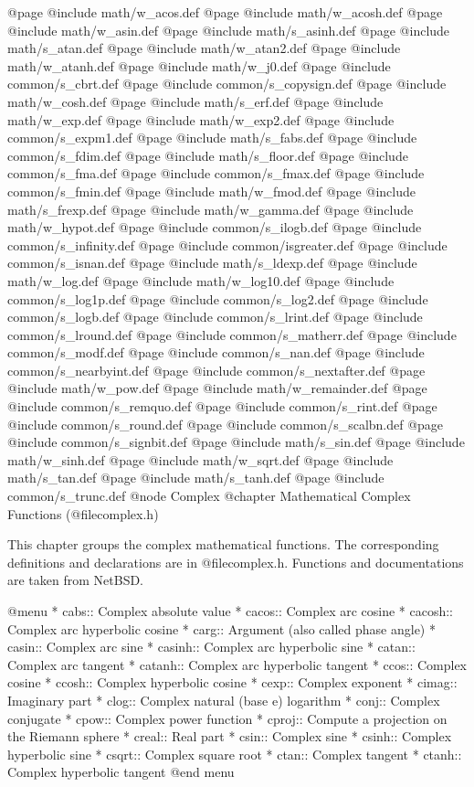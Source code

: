 @page @include   math/w_acos.def
@page @include   math/w_acosh.def
@page @include   math/w_asin.def
@page @include   math/s_asinh.def
@page @include   math/s_atan.def
@page @include   math/w_atan2.def
@page @include   math/w_atanh.def
@page @include   math/w_j0.def
@page @include common/s_cbrt.def
@page @include common/s_copysign.def
@page @include   math/w_cosh.def
@page @include   math/s_erf.def
@page @include   math/w_exp.def
@page @include   math/w_exp2.def
@page @include common/s_expm1.def
@page @include   math/s_fabs.def
@page @include common/s_fdim.def
@page @include   math/s_floor.def
@page @include common/s_fma.def
@page @include common/s_fmax.def
@page @include common/s_fmin.def
@page @include   math/w_fmod.def
@page @include   math/s_frexp.def
@page @include   math/w_gamma.def
@page @include   math/w_hypot.def
@page @include common/s_ilogb.def
@page @include common/s_infinity.def
@page @include   common/isgreater.def
@page @include common/s_isnan.def
@page @include   math/s_ldexp.def
@page @include   math/w_log.def
@page @include   math/w_log10.def
@page @include common/s_log1p.def
@page @include common/s_log2.def
@page @include common/s_logb.def
@page @include common/s_lrint.def
@page @include common/s_lround.def
@page @include common/s_matherr.def
@page @include common/s_modf.def
@page @include common/s_nan.def
@page @include common/s_nearbyint.def
@page @include common/s_nextafter.def
@page @include   math/w_pow.def
@page @include   math/w_remainder.def
@page @include common/s_remquo.def
@page @include common/s_rint.def
@page @include common/s_round.def
@page @include common/s_scalbn.def
@page @include common/s_signbit.def
@page @include   math/s_sin.def
@page @include   math/w_sinh.def
@page @include   math/w_sqrt.def
@page @include   math/s_tan.def
@page @include   math/s_tanh.def
@page @include common/s_trunc.def
@node Complex
@chapter Mathematical Complex Functions (@file{complex.h})

This chapter groups the complex mathematical functions.  The
corresponding definitions and declarations are in @file{complex.h}.  
Functions and documentations are taken from NetBSD.

@menu 
* cabs::	Complex absolute value
* cacos::	Complex arc cosine
* cacosh::	Complex arc hyperbolic cosine
* carg::	Argument (also called phase angle)
* casin::	Complex arc sine
* casinh::	Complex arc hyperbolic sine
* catan::	Complex arc tangent
* catanh::	Complex arc hyperbolic tangent
* ccos::	Complex cosine
* ccosh::	Complex hyperbolic cosine
* cexp::	Complex exponent
* cimag::	Imaginary part
* clog::	Complex natural (base e) logarithm
* conj::	Complex conjugate
* cpow::	Complex power function
* cproj::	Compute a projection on the Riemann sphere
* creal::	Real part
* csin::	Complex sine
* csinh::	Complex hyperbolic sine
* csqrt::	Complex square root
* ctan::	Complex tangent
* ctanh::	Complex hyperbolic tangent
@end menu


